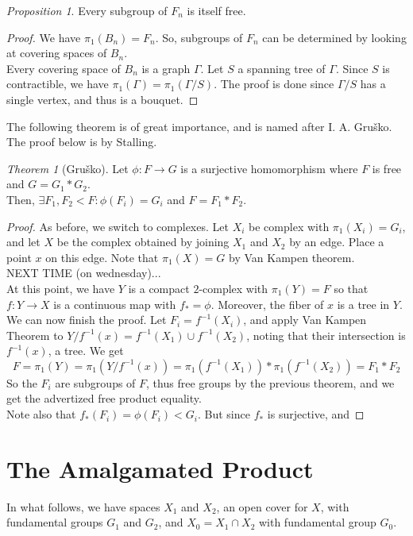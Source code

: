 \documentclass[11pt]{article}
\theoremstyle{definition}
\theoremstyle{example}
\theoremstyle{remark}
\theoremstyle{lemma}
\theoremstyle{proposition}
\newtheorem{proposition}{Proposition}[section]
\theoremstyle{Problem}
\theoremstyle{Solution}
\theoremstyle{theorem}
\newtheorem{theorem}{Theorem}[section]
\theoremstyle{corollary}
\begin{document}
\begin{proposition}
Every subgroup of $F_n$ is itself free.
\end{proposition}
\begin{proof}
We have $\pi_1(B_n) = F_n$. So, subgroups of $F_n$ can be determined by looking at covering spaces of $B_n$.\\
Every covering space of $B_n$ is a graph $\Gamma$. Let $S$ a spanning tree of $\Gamma$. Since $S$ is contractible, we have $\pi_1(\Gamma) = \pi_1(\Gamma/S)$. The proof is done since $\Gamma/S$ has a single vertex, and thus is a bouquet. 
\end{proof}

The following theorem is of great importance, and is named after I. A. Gru\v{s}ko. The proof below is by Stalling.
\begin{theorem}[Gru\v{s}ko]
Let $\phi: F \to G$ is a surjective homomorphism where $F$ is free and $G = G_1 * G_2$.\\
Then, $\exists F_1, F_2 < F : \phi(F_i) = G_i$ and $F = F_1 * F_2$.
\end{theorem}
\begin{proof}
As before, we switch to complexes. Let $X_i$ be complex with $\pi_1(X_i) = G_i$, and let $X$ be the complex obtained by joining $X_1$ and $X_2$ by an edge. Place a point $x$ on this edge. Note that $\pi_1(X) = G$ by Van Kampen theorem.\\
NEXT TIME (on wednesday)...\\
At this point, we have $Y$ is a compact $2$-complex with $\pi_1(Y) = F$ so that $f:Y\to X$ is a continuous map with $f_* = \phi$. Moreover, the fiber of $x$ is a tree in $Y$.\\
We can now finish the proof. Let $F_i = f^{-1}(X_i)$, and apply Van Kampen Theorem to $Y/f^{-1}(x) = f^{-1}(X_1) \cup f^{-1}(X_2)$, noting that their intersection is $f^{-1}(x)$, a tree. We get 
$$F = \pi_1(Y) = \pi_1(Y/f^{-1}(x)) = \pi_1(f^{-1}(X_1))*\pi_1(f^{-1}(X_2)) = F_1*F_2$$
So the $F_i$ are subgroups of $F$, thus free groups by the previous theorem, and we get the advertized free product equality. \\
Note also that $f_*(F_i) = \phi(F_i) < G_i$. But since $f_*$ is surjective, and 
\end{proof}


\section{The Amalgamated Product}
In what follows, we have spaces $X_1$ and $X_2$, an open cover for $X$, with fundamental groups $G_1$ and $G_2$, and $X_0 = X_1\cap X_2$ with fundamental group $G_0$.
\end{document}
